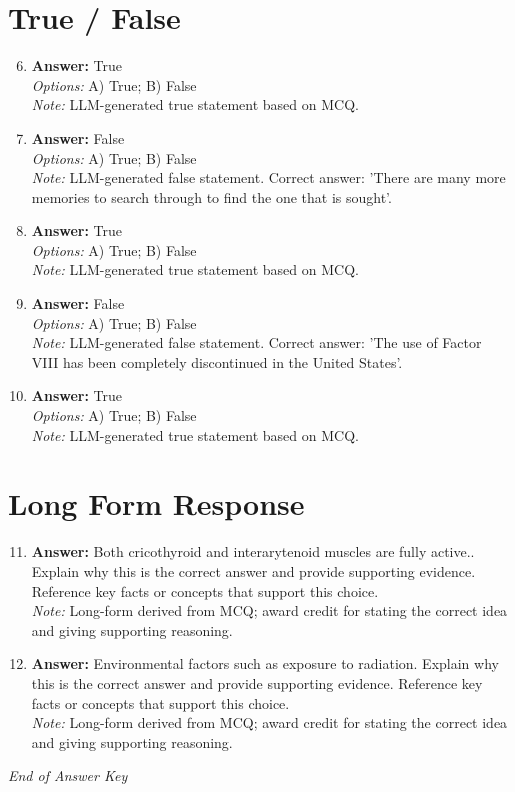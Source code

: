 \documentclass[12pt]{article}
\begin{document}
\section*{True / False}
\begin{enumerate}[label=\arabic*.]
\setcounter{enumi}{5}
\item \textbf{Answer:} True
\\ \textit{Options:} A) True; B) False
\\ \textit{Note:} LLM-generated true statement based on MCQ.
\item \textbf{Answer:} False
\\ \textit{Options:} A) True; B) False
\\ \textit{Note:} LLM-generated false statement. Correct answer: 'There are many more memories to search through to find the one that is sought'.
\item \textbf{Answer:} True
\\ \textit{Options:} A) True; B) False
\\ \textit{Note:} LLM-generated true statement based on MCQ.
\item \textbf{Answer:} False
\\ \textit{Options:} A) True; B) False
\\ \textit{Note:} LLM-generated false statement. Correct answer: 'The use of Factor VIII has been completely discontinued in the United States'.
\item \textbf{Answer:} True
\\ \textit{Options:} A) True; B) False
\\ \textit{Note:} LLM-generated true statement based on MCQ.
\end{enumerate}

\section*{Long Form Response}
\begin{enumerate}[label=\arabic*.]
\setcounter{enumi}{10}
\item \textbf{Answer:} Both cricothyroid and interarytenoid muscles are fully active.. Explain why this is the correct answer and provide supporting evidence. Reference key facts or concepts that support this choice.
\\ \textit{Note:} Long-form derived from MCQ; award credit for stating the correct idea and giving supporting reasoning.
\item \textbf{Answer:} Environmental factors such as exposure to radiation. Explain why this is the correct answer and provide supporting evidence. Reference key facts or concepts that support this choice.
\\ \textit{Note:} Long-form derived from MCQ; award credit for stating the correct idea and giving supporting reasoning.
\end{enumerate}

\vfill
\noindent\textit{End of Answer Key}
\end{document}
